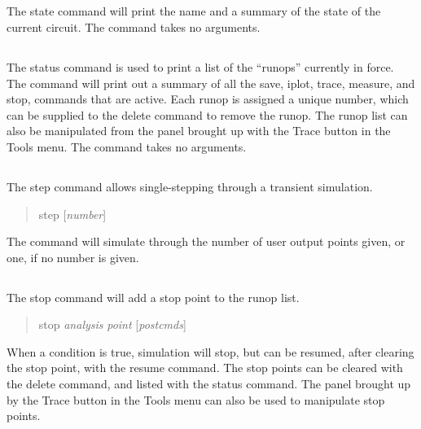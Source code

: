 \subsection{}


The {\cb state} command will print the name and a summary of the state
of the current circuit.  The command takes no arguments.

\subsection{}


The {\cb status} command is used to print a list of the ``runops''
currently in force.  The command will print out a summary of all the
{\cb save}, {\cb iplot}, {\cb trace}, {\cb measure}, and {\cb stop},
commands that are active.  Each runop is assigned a unique number,
which can be supplied to the {\cb delete} command to remove the runop. 
The runop list can also be manipulated from the panel brought up with
the {\cb Trace} button in the {\cb Tools} menu.  The command takes no
arguments.

\subsection{}


The {\cb step} command allows single-stepping through a transient
simulation.
\begin{quote}\vt
step [{\it number\/}]
\end{quote}
The command will simulate through the number of user output points
given, or one, if no number is given.

\subsection{}


The {\cb stop} command will add a stop point to the runop list.
\begin{quote}
{\vt stop} {\it analysis} {\it point} [{\it postcmds\/}]
\end{quote}
When a condition is true, simulation will stop, but can be resumed,
after clearing the stop point, with the {\cb resume} command.  The
stop points can be cleared with the {\cb delete} command, and listed
with the {\cb status} command.  The panel brought up by the {\cb
Trace} button in the {\cb Tools} menu can also be used to manipulate
stop points.

